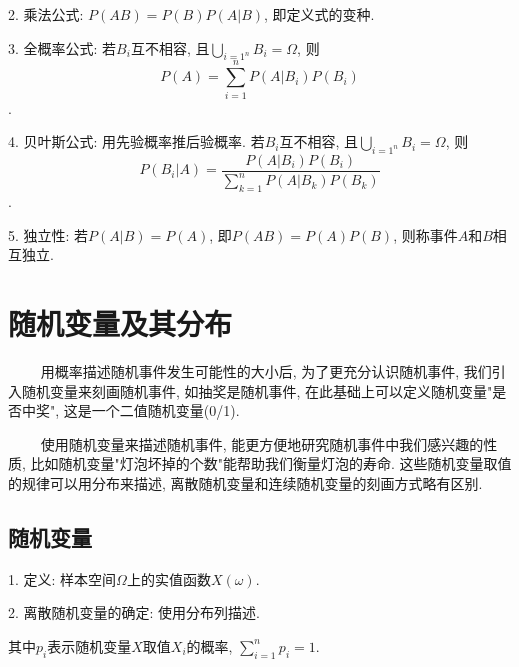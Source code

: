 2. 乘法公式: $P(AB)=P(B)P(A|B)$, 即定义式的变种.

3. 全概率公式: 若$B_i$互不相容, 且$\bigcup\limits_{i=1^n}B_i=\Omega$, 则
\begin{equation*}
    P(A)=\sum\limits_{i=1}^n P(A|B_i)P(B_i)
\end{equation*}.

4. 贝叶斯公式: 用先验概率推后验概率.  若$B_i$互不相容, 且$\bigcup\limits_{i=1^n}B_i=\Omega$, 则
\begin{equation*}
    P(B_i|A)=\frac{P(A|B_i)P(B_i)}{\sum\limits_{k=1}^n P(A|B_k)P(B_k)}
\end{equation*}.

5. 独立性: 若$P(A|B)=P(A)$, 即$P(AB)=P(A)P(B)$, 则称事件$A$和$B$相互独立.

\section{随机变量及其分布}

\begin{tcolorbox}[colback=red!5,colframe=red!75!black]
    ~~~~ 用概率描述随机事件发生可能性的大小后, 为了更充分认识随机事件, 我们引入随机变量来刻画随机事件, 如抽奖是随机事件, 在此基础上可以定义随机变量"是否中奖", 这是一个二值随机变量(0/1). 

    ~~~~ 使用随机变量来描述随机事件, 能更方便地研究随机事件中我们感兴趣的性质, 比如随机变量"灯泡坏掉的个数"能帮助我们衡量灯泡的寿命. 这些随机变量取值的规律可以用分布来描述, 离散随机变量和连续随机变量的刻画方式略有区别.

\end{tcolorbox}

\subsection{随机变量}

1. 定义: 样本空间$\Omega$上的实值函数$X(\omega)$. 

2. 离散随机变量的确定: 使用分布列描述.

\begin{table}[H]
    \centering
\end{table}

其中$p_i$表示随机变量$X$取值$X_i$的概率, $\sum\limits_{i=1}^n p_i=1$.

